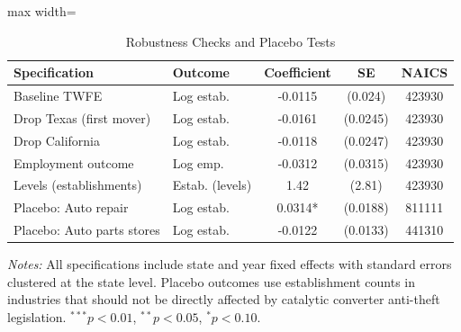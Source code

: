 \begin{table}[htbp]
\centering
\caption{Robustness Checks and Placebo Tests}
\label{tab:robustness}
\begin{threeparttable}
\begin{adjustbox}{max width=\textwidth}
\begin{tabular}{llccc}
\toprule
Specification & Outcome & Coefficient & SE & NAICS \\
\midrule
Baseline TWFE & Log estab. & -0.0115 & (0.024) & 423930 \\
Drop Texas (first mover) & Log estab. & -0.0161 & (0.0245) & 423930 \\
Drop California & Log estab. & -0.0118 & (0.0247) & 423930 \\
Employment outcome & Log emp. & -0.0312 & (0.0315) & 423930 \\
Levels (establishments) & Estab. (levels) & 1.42 & (2.81) & 423930 \\
Placebo: Auto repair & Log estab. & 0.0314* & (0.0188) & 811111 \\
Placebo: Auto parts stores & Log estab. & -0.0122 & (0.0133) & 441310 \\
\bottomrule
\end{tabular}
\end{adjustbox}
\begin{tablenotes}[flushleft]
\small
\item \textit{Notes:} All specifications include state and year fixed effects with standard errors clustered at the state level. Placebo outcomes use establishment counts in industries that should not be directly affected by catalytic converter anti-theft legislation. $^{***}p<0.01$, $^{**}p<0.05$, $^{*}p<0.10$.
\end{tablenotes}
\end{threeparttable}
\end{table}

